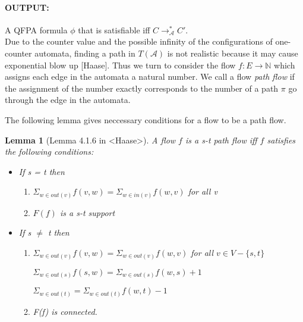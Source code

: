 \documentclass{article}
\newtheorem{lemma}{Lemma}
\begin{document}
\paragraph{OUTPUT:} A QFPA formula $\phi$ that is satisfiable iff $C \rightarrow^*_\mathcal{A} C'$.\\

Due to the counter value and the possible infinity of the configurations of one-counter automata, finding a path in $T(\mathcal{A})$ is not realistic because it may cause exponential blow up [Haase]. Thus we turn to consider the flow $f: E \rightarrow \mathbb{N}$ which assigns each edge in the automata a natural number. We call a flow \textit{path flow } if the assignment of the number exactly corresponds to the number of a path $\pi$ go through the edge in the automata. 

The following lemma gives neccessary conditions for a flow to be a path flow.



\begin{lemma}[Lemma 4.1.6 in <Haase>]  A flow $f$ is a \textit{s-t} path flow iff $f$ satisfies the following conditions:
\begin{itemize}
\item If s = t then
\begin{enumerate}
\item $\Sigma_{w\in out(v)} f(v,w) = \Sigma_{w\in in(v)} f(w,v)$ for all v
\item $F(f)$ is a s-t support


\end{enumerate}


\item If s $\ne$ t then
\begin{enumerate}
\item $\Sigma_{w\in out(v)} f(v,w) = \Sigma_{w\in out(v)} f(w,v)$ for all $v\in V-\{s,t\}$

$\Sigma_{w\in out(s)} f(s,w) = \Sigma_{w\in out(s)} f(w,s) + 1$

$\Sigma_{w\in out(t)} = \Sigma_{w\in out(t)} f(w,t) - 1$


\item F(f) is connected.
\end{enumerate}

\end{itemize}



\end{lemma}
\end{document}
